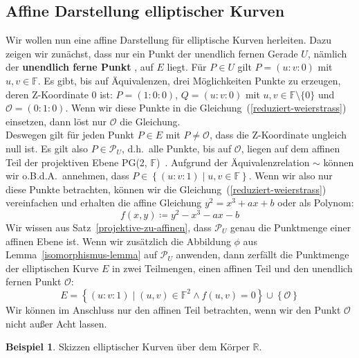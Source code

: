 \documentclass[hidelinks]{article}
\theoremstyle{plain}
\theoremstyle{definition}
\newtheorem{bsp}[thm]{Beispiel}
\theoremstyle{rem}
\newcommand{\pgtwo}{PG(2, $\mathbb{F}$)\ }
\newcommand{\fnz}{\mathbb{F}\setminus\{0\}}
\newcommand{\pu}{\mathcal{P}_U}
\newcommand{\patinf}{\mathcal{O}}
\begin{document}
\begin{sloppypar}
\subsection{Affine Darstellung elliptischer Kurven} \label{affine-darstellung}
Wir wollen nun eine affine Darstellung für elliptische Kurven herleiten. Dazu zeigen wir zunächst, dass nur ein Punkt der unendlich fernen Gerade $U$, nämlich der \textbf{unendlich ferne Punkt} \makebox{$\patinf = (0:1:0)$}, auf $E$ liegt. Für $P \in U$ gilt $P = (u:v:0)$ mit $u,v \in \mathbb{F}$. Es gibt, bis auf Äquivalenzen, drei Möglichkeiten Punkte zu erzeugen, deren Z-Koordinate 0 ist: $P = (1:0:0)$, $Q = (u:v:0)$ mit $u,v \in \fnz$ und $\patinf = (0:1:0)$. 
Wenn wir diese Punkte in die Gleichung~(\ref{reduziert-weierstrass}) einsetzen, dann löst nur $\patinf$ die Gleichung.\\ 
Deswegen gilt für jeden Punkt $P \in E$ mit $P \neq \patinf$, dass die Z-Koordinate ungleich null ist. Es gilt also $P \in \pu$, d.h.\ alle Punkte, bis auf $\patinf$, liegen auf dem affinen Teil der projektiven Ebene \pgtwo. 
Aufgrund der Äquivalenzrelation $\sim$ können wir o.B.d.A.\ annehmen, dass $P \in \left\{(u:v:1) \mid u,v \in \mathbb{F} \right\}$. Wenn wir also nur diese Punkte betrachten, können wir die Gleichung~(\ref{reduziert-weierstrass}) vereinfachen und erhalten die affine Gleichung $y^2 = x^3 + ax + b$ oder als Polynom: 
\begin{equation} \label{affines-polynom}
    f(x,y) \coloneqq y^2 - x^3 - ax - b
\end{equation}
Wir wissen aus Satz~\ref{projektive-zu-affinen}, dass $\pu$ genau die Punktmenge einer affinen Ebene ist. Wenn wir zusätzlich die Abbildung $\phi$ aus Lemma~\ref{isomorphismus-lemma} auf $\pu$ anwenden, dann zerfällt die Punktmenge der elliptischen Kurve $E$ in zwei Teilmengen, einen affinen Teil und den unendlich fernen Punkt $\patinf$:
\begin{equation} \label{elliptic-curve-aff-inf}
    E = \left\{(u:v:1) \mid (u,v) \in \mathbb{F}^2 \land f(u,v) = 0 \right\} \cup \left\{ \patinf \right\}
\end{equation}
Wir können im Anschluss nur den affinen Teil betrachten, wenn wir den Punkt $\patinf$ nicht außer Acht lassen.
\begin{bsp}
    Skizzen elliptischer Kurven über dem Körper $\mathbb{R}$.
    \begin{figure}[H]
        \centering
        \subfloat[$y^2=x^3 + 0.5x + 2$]{
            \begin{tikzpicture}
                \begin{axis}[
                    axis equal, 
                    scale=0.8
                    ]

\end{axis}
\end{tikzpicture}}
\end{figure}
\end{bsp}
\end{sloppypar}
\end{document}
